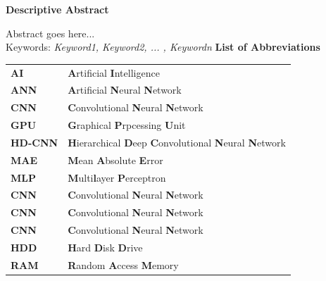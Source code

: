 \documentclass[12pt]{extarticle}
\begin{document}
	\tableofcontents
	\listoffigures
	\listoftables
	\newpage
	\begin{center}
		\LARGE{\textbf{Descriptive Abstract}}\\ \vspace{1cm}
	\end{center}
	Abstract goes here...\\
	Keywords: \emph{Keyword1, Keyword2, ... , Keywordn}
	\newpage
	\LARGE{\textbf{List of Abbreviations}}\\ \vspace{1cm}
	\begin{center}
		\begin{tabular}{l l}
			\multicolumn{1}{p{3cm}}{\large{\textbf{AI}}} &  \multicolumn{1}{p{8cm}}{\large{\textbf{A}rtificial \textbf{I}ntelligence}} \\
			\multicolumn{1}{p{3cm}}{\large{\textbf{ANN}}} &  \multicolumn{1}{p{8cm}}{\large{\textbf{A}rtificial \textbf{N}eural \textbf{N}etwork}} \\
			\multicolumn{1}{p{3cm}}{\large{\textbf{CNN}}} &  \multicolumn{1}{p{8cm}}{\large{\textbf{C}onvolutional \textbf{N}eural \textbf{N}etwork}}\\ 
			\multicolumn{1}{p{3cm}}{\large{\textbf{GPU}}} &  \multicolumn{1}{p{8cm}}{\large{\textbf{G}raphical \textbf{P}rpcessing \textbf{U}nit}}\\ 
			\multicolumn{1}{p{3cm}}{\large{\textbf{HD-CNN}}} &  \multicolumn{1}{p{8cm}}{\large{\textbf{H}ierarchical \textbf{D}eep \textbf{C}onvolutional \textbf{N}eural \textbf{N}etwork}}\\ 
			\multicolumn{1}{p{3cm}}{\large{\textbf{MAE}}} &  \multicolumn{1}{p{8cm}}{\large{\textbf{M}ean \textbf{A}bsolute \textbf{E}rror}}\\  
			\multicolumn{1}{p{3cm}}{\large{\textbf{MLP}}} &  \multicolumn{1}{p{8cm}}{\large{\textbf{M}ulti\textbf{l}ayer \textbf{P}erceptron}}\\ 
			\multicolumn{1}{p{3cm}}{\large{\textbf{CNN}}} &  \multicolumn{1}{p{8cm}}{\large{\textbf{C}onvolutional \textbf{N}eural \textbf{N}etwork}}\\ 
			\multicolumn{1}{p{3cm}}{\large{\textbf{CNN}}} &  \multicolumn{1}{p{8cm}}{\large{\textbf{C}onvolutional \textbf{N}eural \textbf{N}etwork}}\\ 
			\multicolumn{1}{p{3cm}}{\large{\textbf{CNN}}} &  \multicolumn{1}{p{8cm}}{\large{\textbf{C}onvolutional \textbf{N}eural \textbf{N}etwork}}\\
			\multicolumn{1}{p{3cm}}{\large{\textbf{HDD}}} &  \multicolumn{1}{p{8cm}}{\large{\textbf{H}ard \textbf{D}isk \textbf{D}rive}}\\ 
			\multicolumn{1}{p{3cm}}{\large{\textbf{RAM}}} &  \multicolumn{1}{p{8cm}}{\large{\textbf{R}andom \textbf{A}ccess \textbf{M}emory}}
			 
		\end{tabular}
	\end{center}
\end{document}

